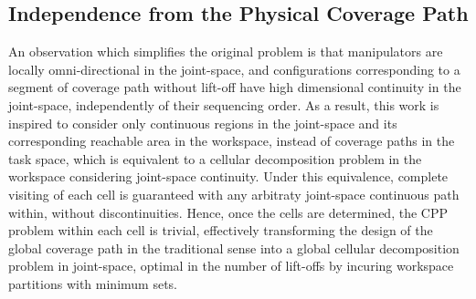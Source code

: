 \documentclass[journal]{IEEEtran}
\begin{document}


\subsection{Independence from the Physical Coverage Path}
An observation which simplifies the original problem is that manipulators are locally omni-directional in the joint-space, and configurations corresponding to a segment of coverage path without lift-off have high dimensional continuity in the joint-space, independently of their sequencing order. 
As a result, this work is inspired to consider only continuous regions in the joint-space and its corresponding reachable area in the workspace, instead of coverage paths in the task space, which is equivalent to a cellular decomposition problem in the workspace considering joint-space continuity. Under this equivalence, complete visiting of each cell is guaranteed with any arbitraty joint-space continuous path within, without discontinuities. 
Hence, once the cells are determined, the CPP problem within each cell 
is trivial, effectively transforming the design of the global coverage path in the traditional sense into a global cellular decomposition problem in joint-space, optimal in the number of lift-offs by incuring workspace partitions with minimum sets.
 
\end{document}
